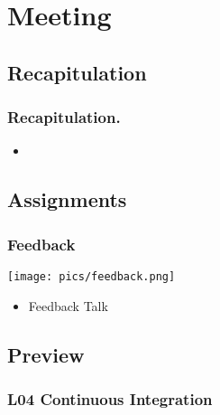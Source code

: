 \section{Meeting}

\subsection{Recapitulation}

\begin{frame}
	\frametitle{Recapitulation.}
	\begin{itemize}
		\item 
	\end{itemize}
\end{frame}

\subsection{Assignments}

\begin{frame}
	\frametitle{Feedback}

	\hfill \texttt{[image: pics/feedback.png]}
	\vspace{-1cm}
	\begin{itemize}
		\item Feedback Talk
	\end{itemize}
\end{frame}

\subsection{Preview}

\begin{frame}
	\frametitle{L04 Continuous Integration}
\end{frame}



